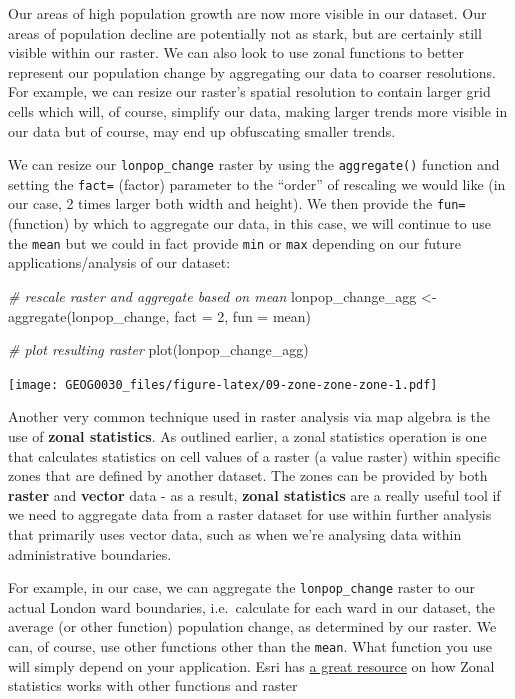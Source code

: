\documentclass[
]{book}
\newenvironment{Shaded}{\begin{snugshade}}{\end{snugshade}}
\newcommand{\AttributeTok}[1]{\textcolor[rgb]{0.77,0.63,0.00}{#1}}
\newcommand{\CommentTok}[1]{\textcolor[rgb]{0.56,0.35,0.01}{\textit{#1}}}
\newcommand{\DecValTok}[1]{\textcolor[rgb]{0.00,0.00,0.81}{#1}}
\newcommand{\FunctionTok}[1]{\textcolor[rgb]{0.00,0.00,0.00}{#1}}
\newcommand{\NormalTok}[1]{#1}
\newcommand{\OtherTok}[1]{\textcolor[rgb]{0.56,0.35,0.01}{#1}}
\begin{document}
Our areas of high population growth are now more visible in our dataset. Our areas of population decline are potentially not as stark, but are certainly still visible within our raster. We can also look to use zonal functions to better represent our population change by aggregating our data to coarser resolutions. For example, we can resize our raster's spatial resolution to contain larger grid cells which will, of course, simplify our data, making larger trends more visible in our data but of course, may end up obfuscating smaller trends.

We can resize our \texttt{lonpop\_change} raster by using the \texttt{aggregate()} function and setting the \texttt{fact=} (factor) parameter to the ``order'' of rescaling we would like (in our case, 2 times larger both width and height). We then provide the \texttt{fun=} (function) by which to aggregate our data, in this case, we will continue to use the \texttt{mean} but we could in fact provide \texttt{min} or \texttt{max} depending on our future applications/analysis of our dataset:

\begin{Shaded}
\begin{Highlighting}[]
\CommentTok{\# rescale raster and aggregate based on mean}
\NormalTok{lonpop\_change\_agg }\OtherTok{\textless{}{-}} \FunctionTok{aggregate}\NormalTok{(lonpop\_change, }\AttributeTok{fact =} \DecValTok{2}\NormalTok{, }\AttributeTok{fun =}\NormalTok{ mean)}

\CommentTok{\# plot resulting raster}
\FunctionTok{plot}\NormalTok{(lonpop\_change\_agg)}
\end{Highlighting}
\end{Shaded}

\texttt{[image: GEOG0030\_files/figure-latex/09-zone-zone-zone-1.pdf]}

Another very common technique used in raster analysis via map algebra is the use of \textbf{zonal statistics}. As outlined earlier, a zonal statistics operation is one that calculates statistics on cell values of a raster (a value raster) within specific zones that are defined by another dataset. The zones can be provided by both \textbf{raster} and \textbf{vector} data - as a result, \textbf{zonal statistics} are a really useful tool if we need to aggregate data from a raster dataset for use within further analysis that primarily uses vector data, such as when we're analysing data within administrative boundaries.

For example, in our case, we can aggregate the \texttt{lonpop\_change} raster to our actual London ward boundaries, i.e.~calculate for each ward in our dataset, the average (or other function) population change, as determined by our raster. We can, of course, use other functions other than the \texttt{mean}. What function you use will simply depend on your application. Esri has \href{https://desktop.arcgis.com/en/arcmap/10.3/tools/spatial-analyst-toolbox/h-how-zonal-statistics-works.htm}{a great resource} on how Zonal statistics works with other functions and raster
\end{document}
